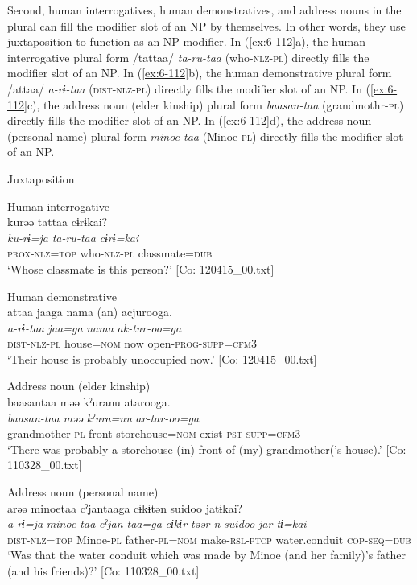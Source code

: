   Second, human interrogatives, human demonstratives, and address nouns in the plural can fill the modifier slot of an NP by themselves. In other words, they use juxtaposition to function as an NP modifier. In (\ref{ex:6-112}a), the human interrogative plural form /tattaa/ \textit{ta-ru-taa} (who-\textsc{nlz}-\textsc{pl}) directly fills the modifier slot of an NP. In (\ref{ex:6-112}b), the human demonstrative plural form /attaa/ \textit{a-rɨ-taa} (\textsc{dist}-\textsc{nlz}-\textsc{pl}) directly fills the modifier slot of an NP. In (\ref{ex:6-112}c), the address noun (elder kinship) plural form \textit{baasan-taa} (grandmothr-\textsc{pl}) directly fills the modifier slot of an NP. In (\ref{ex:6-112}d), the address noun (personal name) plural form \textit{minoe-taa} (Minoe-\textsc{pl}) directly fills the modifier slot of an NP.

\ea\label{ex:6-112}
  Juxtaposition

 \ea Human interrogative\\
{\TM}
\glll  kurəə  tattaa  cɨrɨkai?\\
\textit{ku-rɨ=ja}  \textit{ta-ru-taa}  \textit{cɨrɨ=kai}\\
\textsc{prox}-\textsc{nlz}=\textsc{top}  who-\textsc{nlz}-\textsc{pl}  classmate=\textsc{dub}\\
\glt ‘Whose classmate is this person?’ [Co: 120415\_00.txt]

\ex Human demonstrative\\
{\TM}
\glll  attaa  jaaga  nama  (an)  acjurooga.\\
\textit{a-rɨ-taa}  \textit{jaa=ga}  \textit{nama}    \textit{ak-tur-oo=ga}\\
\textsc{dist}-\textsc{nlz}-\textsc{pl}  house=\textsc{nom}  now    open-\textsc{prog}-\textsc{supp}=\textsc{cfm}3\\
\glt ‘Their house is probably unoccupied now.’ [Co: 120415\_00.txt]

\ex Address noun (elder kinship)\\
{\US}
\gll baasantaa  məə  kˀuranu  atarooga.\\
      \textit{baasan-taa}  \textit{məə}  \textit{kˀura=nu}  \textit{ar-tar-oo=ga}\\
      grandmother-\textsc{pl}  front  storehouse=\textsc{nom}  exist-\textsc{pst}-\textsc{supp}=\textsc{cfm}3\\
\glt ‘There was probably a storehouse (in) front of (my) grandmother(’s house).’ [Co: 110328\_00.txt]

\ex Address noun (personal name)\\
{\TM}
\glll  arəə  minoetaa  cˀjantaaga  cɨkɨtən  {\textbar}suidoo{\textbar}  jatɨkai?\\
\textit{a-rɨ=ja}  \textit{minoe-taa}  \textit{cˀjan-taa=ga}  \textit{cɨkɨr-təər-n}  \textit{suidoo}  \textit{jar-tɨ=kai}\\
\textsc{dist}-\textsc{nlz}=\textsc{top}  Minoe-\textsc{pl}  father-\textsc{pl}=\textsc{nom}  make-\textsc{rsl}-\textsc{ptcp} water.conduit  \textsc{cop}-\textsc{seq}=\textsc{dub}\\
\glt ‘Was that the water conduit which was made by Minoe (and her family)’s father (and his friends)?’ [Co: 110328\_00.txt]
\z
\z

